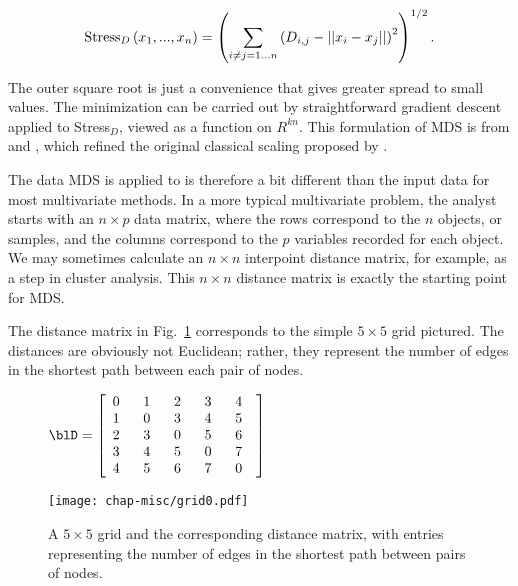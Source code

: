 \begin{eqnarray*}
{\rm Stress}_D \left( x_1, ..., x_n \right) = 
  \left( \sum_{ i \neq j = 1...n} \left( D_{i,j} - || x_i - x_j || \right) ^ 2 \right) ^ {1/2}.
\end{eqnarray*}

\noindent The outer square root is just a convenience that gives
greater spread to small values.  The minimization can be carried out
by straightforward gradient descent applied to Stress$_D$, viewed as a
function on $R^{kn}$. This formulation of MDS is from
 and , which refined the original
classical scaling proposed by .



The data MDS is applied to is therefore a bit different than the input
data for most multivariate methods.  In a more typical multivariate
problem, the analyst starts with an $n\times p$ data matrix, where the
rows correspond to the $n$ objects, or samples, and the columns
correspond to the $p$ variables recorded for each object. We may
sometimes calculate an $n\times n$ interpoint distance matrix, for
example, as a step in cluster analysis.  This $n\times n$ distance
matrix is exactly the starting point for MDS.

The distance matrix in Fig.~\ref{grid0} corresponds to the simple
$5\times 5$ grid pictured.  The distances are obviously not Euclidean;
rather, they represent the number of edges in the shortest path
between each pair of nodes.

\begin{figure}[!h]
\centering
\begin{minipage}[c]{0.45\textwidth}
  \centering
  $\blD = \left[ \begin{array}{p{1.2em}p{1.2em}p{1.2em}p{1.2em}p{1em}}
    0 & 1 & 2 & 3 & 4\\
    1 & 0 & 3 & 4 & 5\\
    2 & 3 & 0 & 5 & 6\\
    3 & 4 & 5 & 0 & 7\\
    4 & 5 & 6 & 7 & 0 \end{array} \right]$
\end{minipage}
\begin{minipage}[c]{0.45\textwidth}
  \texttt{[image: chap-misc/grid0.pdf]}
\end{minipage}
\caption[A grid and its distance matrix]{A $5\times 5$ grid and the
corresponding distance matrix, with entries representing the number of
edges in the shortest path between pairs of nodes.}
\label{grid0}
\end{figure}



